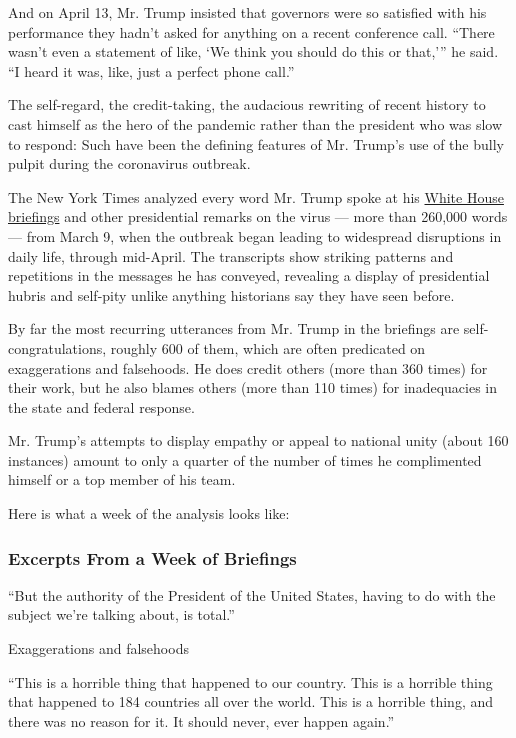 And on April 13, Mr. Trump insisted that governors were so satisfied
with his performance they hadn't asked for anything on a recent
conference call. ``There wasn't even a statement of like, `We think you
should do this or that,''' he said. ``I heard it was, like, just a
perfect phone call.''

The self-regard, the credit-taking, the audacious rewriting of recent
history to cast himself as the hero of the pandemic rather than the
president who was slow to respond: Such have been the defining features
of Mr. Trump's use of the bully pulpit during the coronavirus outbreak.

The New York Times analyzed every word Mr. Trump spoke at his
\href{https://www.whitehouse.gov/remarks/}{White House briefings} and
other presidential remarks on the virus --- more than 260,000 words ---
from March 9, when the outbreak began leading to widespread disruptions
in daily life, through mid-April. The transcripts show striking patterns
and repetitions in the messages he has conveyed, revealing a display of
presidential hubris and self-pity unlike anything historians say they
have seen before.

By far the most recurring utterances from Mr. Trump in the briefings are
self-congratulations, roughly 600 of them, which are often predicated on
exaggerations and falsehoods. He does credit others (more than 360
times) for their work, but he also blames others (more than 110 times)
for inadequacies in the state and federal response.

Mr. Trump's attempts to display empathy or appeal to national unity
(about 160 instances) amount to only a quarter of the number of times he
complimented himself or a top member of his team.

Here is what a week of the analysis looks like:

\hypertarget{excerpts-from-a-week-of-briefings}{%
\subsubsection{Excerpts From a Week of
Briefings}\label{excerpts-from-a-week-of-briefings}}

``But the authority of the President of the United States, having to do
with the subject we're talking about, is total.''

Exaggerations and falsehoods

``This is a horrible thing that happened to our country. This is a
horrible thing that happened to 184 countries all over the world. This
is a horrible thing, and there was no reason for it. It should never,
ever happen again.''

